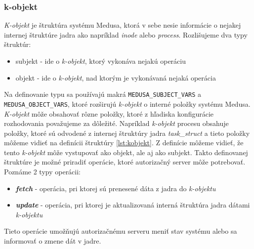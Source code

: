 \subsubsection{k-objekt} \label{kobjekt}
\textit{K-objekt} je štruktúra systému Medusa, ktorá v sebe nesie informácie o nejakej internej štruktúre jadra ako napríklad \textit{inode} alebo \textit{process}. Rozlišujeme dva typy štruktúr:
\begin{itemize}
\item subjekt - ide o \textit{k-objekt}, ktorý vykonáva nejakú operáciu
\item objekt - ide o \textit{k-objekt}, nad ktorým je vykonávaná nejaká operácia
\end{itemize}
Na definovanie typu sa používajú makrá \texttt{MEDUSA\_SUBJECT\_VARS} a \texttt{MEDUSA\_OBJECT\_VARS}, ktoré rozširujú \textit{k-objekt} o interné položky systému Medusa.\cite{kacer}
\textit{K-objekt} môže obsahovať rôzne položky, ktoré z hľadiska konfigurácie rozhodovania považujeme za dôležité. Napríklad \textit{k-objekt} procesu obsahuje položky, ktoré sú odvodené z internej štruktúry jadra \textit{task\_struct} a tieto položky môžeme vidieť na definícii štruktúry \ref{lst:kobjekt}. Z definície môžeme vidieť, že tento \textit{k-objekt} môže vystupovať ako objekt, ale aj ako subjekt. Takto definovanej štruktúre je možné priradiť operácie, ktoré autorizačný server môže potrebovať. Poznáme 2 typy operácii:
\begin{itemize}
\item \textbf{\textit{fetch}} - operácia, pri ktorej sú prenesené dáta z jadra do \textit{k-objektu}
\item \textbf{\textit{update}} - operácia, pri ktorej je aktualizovaná interná štruktúra jadra dátami \textit{k-objektu}
\end{itemize}
Tieto operácie umožňujú autorizačnému serveru meniť stav systému alebo sa informovať o zmene dát v jadre.
